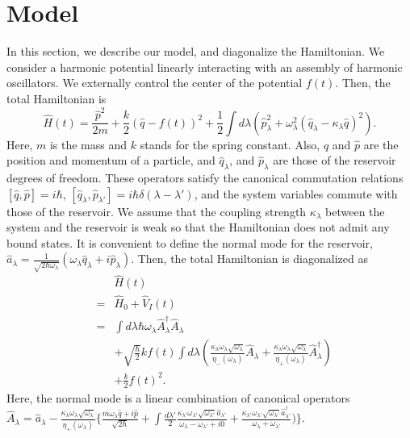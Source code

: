 \documentclass[aps,pre,twocolumn,eqsecnum,showpacs,superscriptaddress]{revtex4}
\begin{document}
\section{Model}
In this section, we describe our model, and diagonalize the Hamiltonian.
We consider a harmonic potential linearly interacting with an assembly of harmonic oscillators\cite{Zwanzig1,Monnai1,Gardiner1,Monnai2}. We externally control the center of the potential $f(t)$.  
Then, the total Hamiltonian is 
\begin{equation}
\hat{H}(t)=\frac{\hat{p}^2}{2m}+\frac{k}{2}(\hat{q}-f(t))^2+\frac{1}{2}\int d\lambda(\hat{p}_\lambda^2+\omega_\lambda^2 (\hat{q}_\lambda-\kappa_\lambda \hat{q})^2). \label{Hamiltonian1}
\end{equation}
Here, $m$ is the mass and $k$ stands for the spring constant. Also, $\hat{q}$ and $\hat{p}$ are the position and momentum of a particle, and $\hat{q}_\lambda$, and $\hat{p}_\lambda$ are those of the reservoir degrees of freedom. 
These operators satisfy the canonical commutation relations $[\hat{q},\hat{p}]=i\hbar$, $[\hat{q}_\lambda,\hat{p}_{\lambda'}]=i\hbar\delta(\lambda-\lambda')$, and the system variables commute with those of the reservoir. We assume that the coupling strength $\kappa_\lambda$ between the system and the reservoir is weak so that the Hamiltonian does not admit any bound states.  
It is convenient to define the normal mode for the reservoir, $\hat{a}_\lambda=\frac{1}{\sqrt{2\hbar\omega_\lambda}}(\omega_\lambda \hat{q}_\lambda+i\hat{p}_\lambda)$.
Then, the total Hamiltonian is diagonalized as
\begin{eqnarray}
&&\hat{H}(t) \nonumber \\
&=&\hat{H}_0+\hat{V}_I(t) \nonumber \\
&=&\int d\lambda\hbar\omega_\lambda\hat{A}_\lambda^\dagger\hat{A}_\lambda \nonumber \\
&&+\sqrt{\frac{\hbar}{2}}kf(t)\int d\lambda(\frac{\kappa_\lambda\omega_\lambda\sqrt{\omega_\lambda}}{\eta_-(\omega_\lambda)}\hat{A}_\lambda+\frac{ \kappa_\lambda\omega_\lambda\sqrt{\omega_\lambda}}{\eta_+(\omega_\lambda)}\hat{A}_\lambda^\dagger) \nonumber \\
&&+\frac{k}{2}f(t)^2. \label{Hamiltonian2} 
\end{eqnarray}
Here, the normal mode is a linear combination of canonical operators $\hat{A}_\lambda=\hat{a}_\lambda-\frac{\kappa_\lambda\omega_\lambda\sqrt{\omega_\lambda}}{\eta_+(\omega_\lambda)}\{\frac{m\omega_\lambda\hat{q}+i\hat{p}}{\sqrt{2\hbar}}+\int\frac{d\lambda'}{2}\frac{\kappa_{\lambda'}\omega_{\lambda'}\sqrt{\omega_{\lambda'}}\hat{a}_{\lambda'}}{\omega_\lambda-\omega_{\lambda'}+i0}+\frac{\kappa_{\lambda'}\omega_{\lambda'}\sqrt{\omega_{\lambda'}}\hat{a}_{\lambda'}^\dagger}{\omega_\lambda+\omega_{\lambda'}})\}$. 
\end{document}
